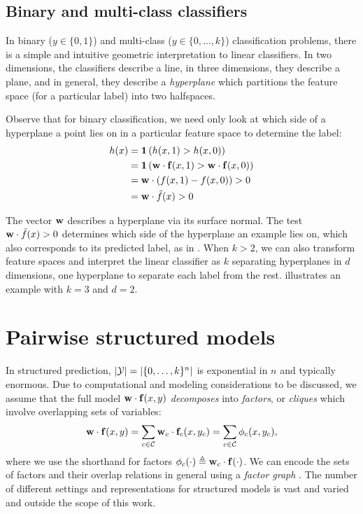 \subsection{Binary and multi-class classifiers}
\label{sec:binary-multi-class}
In binary ($y \in \{0,1\}$) and multi-class ($y \in \{0,\ldots,k\}$) 
classification problems, there is a simple and intuitive geometric 
interpretation to linear classifiers.  In two dimensions, the classifiers 
describe a line, in three dimensions, they describe a plane, and in general, 
they describe a {\em hyperplane} which partitions the feature space (for a 
particular label) into two halfspaces.  

Observe that for binary classification, we need only look at which side of a 
hyperplane a point lies on in a particular feature space to determine the 
label:
\begin{align}
h(x) &= \mathbf{1}\left( h(x,1) > h(x,0)\right) \\
&= \mathbf{1}\left( \mathbf{w} \cdot \mathbf{f}(x,1) > \mathbf{w} \cdot \mathbf{f}(x,0) \right) \\
&= \mathbf{w} \cdot \left(f(x,1) - f(x,0)\right)  > 0\\ 
&= \mathbf{w} \cdot \tilde{f}(x) > 0 
\end{align}

The vector $\mathbf{w}$ describes a hyperplane via its surface normal.  The test $\mathbf{w} 
\cdot \tilde{f}(x) > 0$ determines which side of the hyperplane an example lies 
on, which also corresponds to its predicted label, as 
in .  When $k > 2$, we can also transform 
feature spaces and interpret the linear classifier as $k$ separating 
hyperplanes in $d$ dimensions, one hyperplane to separate each label from the 
rest.   illustrates an example with $k = 
3$ and $d = 2$.

\section{Pairwise structured models}
\label{sec:mrfs}
In structured prediction, $|\mathcal{Y}| = |\{0,\ldots,k\}^n|$ is exponential in $n$ 
and typically enormous. Due to computational and modeling considerations to be 
discussed, we assume that the full model $\mathbf{w} \cdot \mathbf{f}(x,y)$ {\em decomposes} 
into {\em factors}, or {\em cliques} which involve overlapping sets of 
variables:  \begin{equation}
\mathbf{w} \cdot \mathbf{f}(x,y) = \sum_{c \in \mathcal{C}} \mathbf{w}_c \cdot \mathbf{f}_c(x,y_c) = \sum_{c \in \mathcal{C}} 
\phi_c(x,y_c),
\end{equation}
where we use the shorthand for factors $\phi_c(\cdot) \triangleq \mathbf{w}_c \cdot 
\mathbf{f}(\cdot)$.
We can encode the sets of factors and their overlap relations in general using 
a {\em factor graph} \citep{koller-book}.  The number of different settings and 
representations for structured models is vast and varied and outside the scope 
of this work.  

